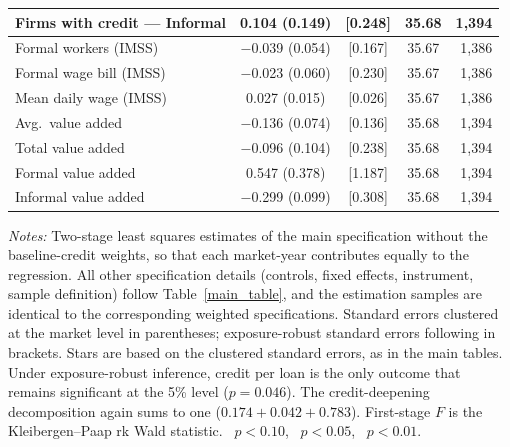 \begin{threeparttable}
\begin{tabular}{lcccr}
        Firms with credit --- Informal  & \phantom{$-$}0.104          (0.149) & [0.248] & 35.68 & 1{,}394 \\
        \midrule
        Formal workers (IMSS)           & $-$0.039          (0.054) & [0.167] & 35.67 & 1{,}386 \\
        Formal wage bill (IMSS)         & $-$0.023          (0.060) & [0.230] & 35.67 & 1{,}386 \\
        Mean daily wage (IMSS)          & \phantom{$-$}0.027\sym{*}   (0.015) & [0.026] & 35.67 & 1{,}386 \\
        Avg.\ value added               & $-$0.136\sym{*}   (0.074) & [0.136] & 35.68 & 1{,}394 \\
        Total value added               & $-$0.096          (0.104) & [0.238] & 35.68 & 1{,}394 \\
        Formal value added              & \phantom{$-$}0.547          (0.378) & [1.187] & 35.68 & 1{,}394 \\
        Informal value added            & $-$0.299\sym{***} (0.099) & [0.308] & 35.68 & 1{,}394 \\
        \bottomrule
    \end{tabular}
    \begin{tablenotes}[flushleft]
        \footnotesize
        \item \textit{Notes:} Two-stage least squares estimates of the main specification without the baseline-credit weights, so that each market-year contributes equally to the regression. All other specification details (controls, fixed effects, instrument, sample definition) follow Table~\ref{main_table}, and the estimation samples are identical to the corresponding weighted specifications. Standard errors clustered at the market level in parentheses; exposure-robust standard errors following \citet{adao2019shiftshare} in brackets. Stars are based on the clustered standard errors, as in the main tables. Under exposure-robust inference, credit per loan is the only outcome that remains significant at the 5\% level ($p=0.046$). The credit-deepening decomposition again sums to one ($0.174+0.042+0.783$). First-stage $F$ is the Kleibergen--Paap rk Wald statistic. \sym{*}~$p<0.10$, \sym{**}~$p<0.05$, \sym{***}~$p<0.01$.
    \end{tablenotes}
\end{threeparttable}